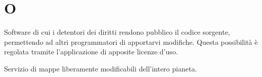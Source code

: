 
\section{O}
Software di cui i detentori dei diritti rendono pubblico il codice sorgente, permettendo ad altri programmatori di apportarvi modifiche. Questa possibilità è regolata tramite l’applicazione di apposite licenze d’uso.

Servizio di mappe liberamente modificabili dell'intero pianeta.

